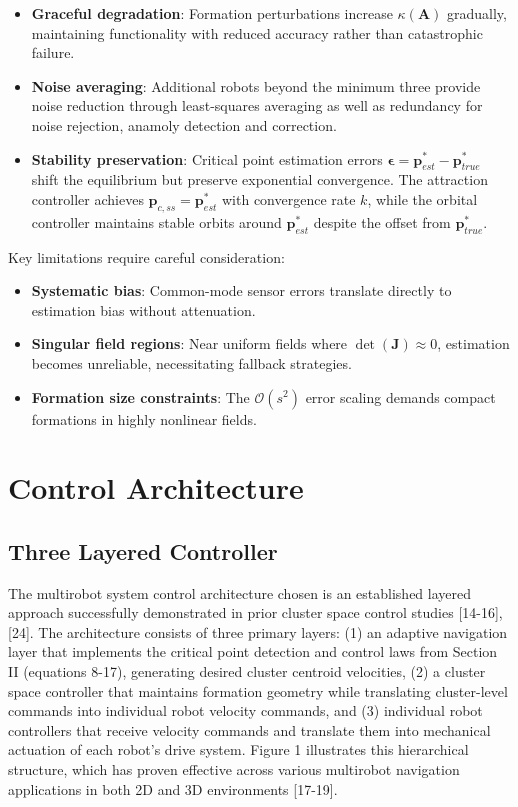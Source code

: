 \documentclass[lettersize,journal]{IEEEtran}
\begin{document}
\begin{itemize}
\item \textbf{Graceful degradation}: Formation perturbations increase $\kappa(\mathbf{A})$ gradually, maintaining functionality with reduced accuracy rather than catastrophic failure.
\item \textbf{Noise averaging}: Additional robots beyond the minimum three provide noise reduction through least-squares averaging as well as redundancy for noise rejection, anamoly detection and correction.
\item \textbf{Stability preservation}: Critical point estimation errors $\boldsymbol{\epsilon} = \mathbf{p}^*_{est} - \mathbf{p}^*_{true}$ shift the equilibrium but preserve exponential convergence. The attraction controller achieves $\mathbf{p}_{c,ss} = \mathbf{p}^*_{est}$ with convergence rate $k$, while the orbital controller maintains stable orbits around $\mathbf{p}^*_{est}$ despite the offset from $\mathbf{p}^*_{true}$.
\end{itemize}

Key limitations require careful consideration:

\begin{itemize}
\item \textbf{Systematic bias}: Common-mode sensor errors translate directly to estimation bias without attenuation.
\item \textbf{Singular field regions}: Near uniform fields where $\det(\mathbf{J}) \approx 0$, estimation becomes unreliable, necessitating fallback strategies.
\item \textbf{Formation size constraints}: The $\mathcal{O}(s^2)$ error scaling demands compact formations in highly nonlinear fields.
\end{itemize}

\section{Control Architecture}

\subsection{Three Layered Controller}

The multirobot system control architecture chosen is an established layered approach successfully demonstrated in prior cluster space control studies [14-16], [24]. The architecture consists of three primary layers: (1) an adaptive navigation layer that implements the critical point detection and control laws from Section II (equations 8-17), generating desired cluster centroid velocities, (2) a cluster space controller that maintains formation geometry while translating cluster-level commands into individual robot velocity commands, and (3) individual robot controllers that receive velocity commands and translate them into mechanical actuation of each robot's drive system. Figure 1 illustrates this hierarchical structure, which has proven effective across various multirobot navigation applications in both 2D and 3D environments [17-19].
\end{document}
